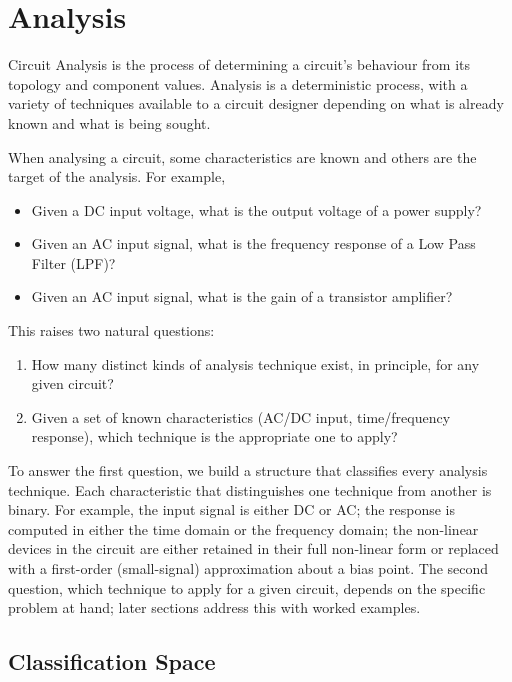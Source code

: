 \chapter{Analysis}\label{ch:analysis}

Circuit Analysis is the process of determining a circuit's behaviour from its
topology and component values. Analysis is a deterministic process, with a
variety of techniques available to a circuit designer depending on what is
already known and what is being sought.

When analysing a circuit, some characteristics are known and others are the
target of the analysis. For example,
\begin{itemize}
    \item Given a DC input voltage, what is the output voltage of a
      power supply?
    \item Given an AC input signal, what is the frequency response of a
      Low Pass Filter (LPF)?
    \item Given an AC input signal, what is the gain of a transistor
      amplifier?
\end{itemize}
This raises two natural questions:
\begin{enumerate}
    \item How many distinct kinds of analysis technique exist, in
      principle, for any given circuit?
    \item Given a set of known characteristics (AC/DC input, time/frequency
      response), which technique is the appropriate one to apply?
\end{enumerate}
To answer the first question, we build a structure that classifies every
analysis technique. Each characteristic that distinguishes one technique from
another is binary. For example, the input signal is either DC or AC; the
response is computed in either the time domain or the frequency domain; the
non-linear devices in the circuit are either retained in their full
non-linear form or replaced with a first-order (small-signal) approximation
about a bias point. The second question, which technique to apply for a
given circuit, depends on the specific problem at hand; later sections
address this with worked examples.


\section{Classification Space}

